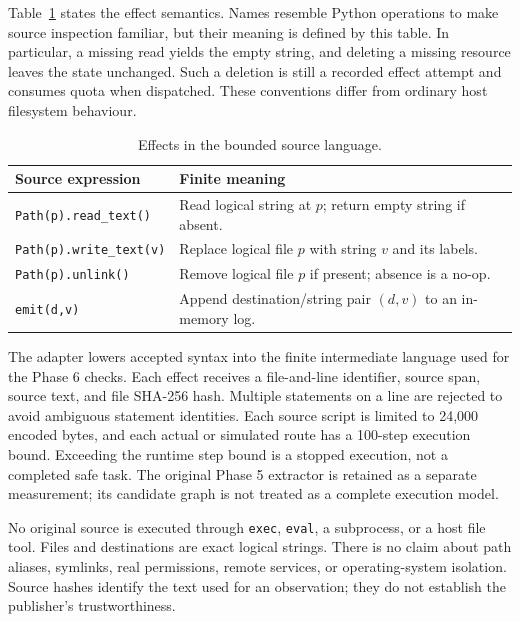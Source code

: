 Table~\ref{tab:semantics} states the effect semantics. Names resemble Python
operations to make source inspection familiar, but their meaning is defined by
this table. In particular, a missing read yields the empty string, and deleting
a missing resource leaves the state unchanged. Such a deletion is still a
recorded effect attempt and consumes quota when dispatched. These conventions
differ from ordinary host filesystem behaviour.

\begin{table}[t]
\caption{Effects in the bounded source language.}
\label{tab:semantics}
\centering\small
\setlength{\tabcolsep}{3pt}
\begin{tabular}{p{}p{}}
\hline
Source expression & Finite meaning \\
\hline
\texttt{Path(p).read\_text()} & Read logical string at $p$; return empty string if absent. \\
\texttt{Path(p).write\_text(v)} & Replace logical file $p$ with string $v$ and its labels. \\
\texttt{Path(p).unlink()} & Remove logical file $p$ if present; absence is a no-op. \\
\texttt{emit(d,v)} & Append destination/string pair $(d,v)$ to an in-memory log. \\
\hline
\end{tabular}
\end{table}

The adapter lowers accepted syntax into the finite intermediate language used
for the Phase 6 checks. Each effect receives a file-and-line identifier, source
span, source text, and file SHA-256 hash. Multiple statements on a line are
rejected to avoid ambiguous statement identities. Each source script is limited
to 24,000 encoded bytes, and each actual or simulated route has a 100-step
execution bound. Exceeding the runtime step bound is a stopped execution, not a
completed safe task. The original Phase 5 extractor is retained as a separate
measurement; its candidate graph is not treated as a complete execution model.

No original source is executed through \texttt{exec}, \texttt{eval}, a
subprocess, or a host file tool. Files and destinations are exact logical
strings. There is no claim about path aliases, symlinks, real permissions,
remote services, or operating-system isolation. Source hashes identify the text
used for an observation; they do not establish the publisher's trustworthiness.

